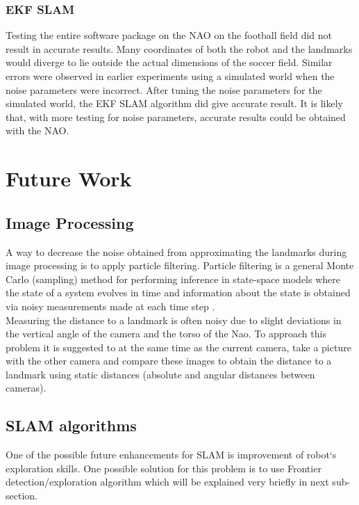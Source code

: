 \documentclass{ba-kecs}
\numberwithin{figure}{section}
\numberwithin{equation}{section}
\begin{document}
\subsubsection{EKF SLAM}
Testing the entire software package on the NAO on the football field did not result in accurate results. Many coordinates of both the robot and the landmarks would diverge to lie outside the actual dimensions of the soccer field. Similar errors were observed in earlier experiments using a simulated world when the noise parameters were incorrect. After tuning the noise parameters for the simulated world, the EKF SLAM algorithm did give accurate result. It is likely that, with more testing for noise parameters, accurate results could be obtained with the NAO.



\section{Future Work}

\subsection{Image Processing}
	A way to decrease the noise obtained from approximating the landmarks during image processing is to apply particle filtering. Particle filtering is a general Monte Carlo (sampling) method for performing inference in
state-space models where the state of a system evolves in time and information about the state is obtained via noisy measurements made at each time step \cite{ParFil}. \\

	Measuring the distance to a landmark is often noisy due to slight deviations in the vertical angle of the camera and the torso of the Nao. To approach this problem it is suggested to at the same time as the current camera, take a picture with the other camera and compare these images to obtain the distance to a landmark using static distances (absolute and angular distances between cameras).
\subsection{SLAM algorithms}	
	One of the possible future enhancements for SLAM is improvement of robot`s exploration skills. One possible solution for this problem is to use Frontier detection/exploration algorithm which will be explained very briefly in next sub-section.
	
\end{document}
